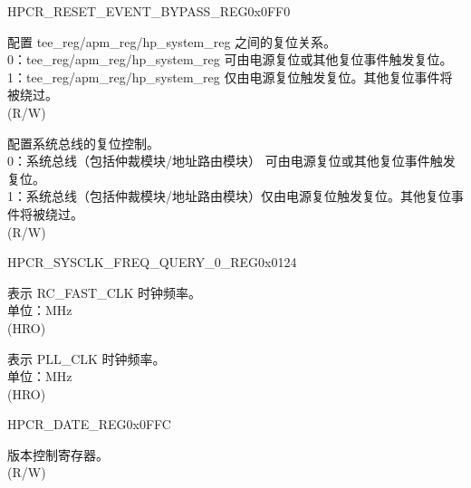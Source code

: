 \begin{register}{H}{PCR\_RESET\_EVENT\_BYPASS\_REG}{0x0FF0}\label{regdesc:PCRRESETEVENTBYPASSREG}
%
%
%
\regnewline%
\begin{regdesc}\begin{reglist}
\label{fielddesc:PCRRESETEVENTBYPASSAPM}\item [PCR\_RESET\_EVENT\_BYPASS\_APM] 配置 tee\_reg/apm\_reg/hp\_system\_reg 之间的复位关系。\\
0：tee\_reg/apm\_reg/hp\_system\_reg 可由电源复位或其他复位事件触发复位。\\
1：tee\_reg/apm\_reg/hp\_system\_reg 仅由电源复位触发复位。其他复位事件将被绕过。\\ 
(R/W)
\label{fielddesc:PCRRESETEVENTBYPASS}\item [PCR\_RESET\_EVENT\_BYPASS] 配置系统总线的复位控制。\\
0：系统总线（包括仲裁模块/地址路由模块） 可由电源复位或其他复位事件触发复位。\\
1：系统总线（包括仲裁模块/地址路由模块）仅由电源复位触发复位。其他复位事件将被绕过。\\
(R/W)
\end{reglist}\end{regdesc}
\end{register}


\begin{register}{H}{PCR\_SYSCLK\_FREQ\_QUERY\_0\_REG}{0x0124}\label{regdesc:PCRSYSCLKFREQQUERY0REG}
%
%
%
\regnewline%
\begin{regdesc}\begin{reglist}
\label{fielddesc:PCRFOSCFREQ}\item [PCR\_FOSC\_FREQ] 表示 RC\_FAST\_CLK 时钟频率。\\
单位：MHz\\ (HRO)
\label{fielddesc:PCRPLLFREQ}\item [PCR\_PLL\_FREQ] 表示 PLL\_CLK 时钟频率。\\
单位：MHz\\
(HRO)
\end{reglist}\end{regdesc}
\end{register}


\begin{register}{H}{PCR\_DATE\_REG}{0x0FFC}\label{regdesc:PCRDATEREG}
%
%
\regnewline%
\begin{regdesc}\begin{reglist}
\label{fielddesc:PCRDATE}\item [PCR\_DATE] 版本控制寄存器。 \\ (R/W)
\end{reglist}\end{regdesc}
\end{register}
